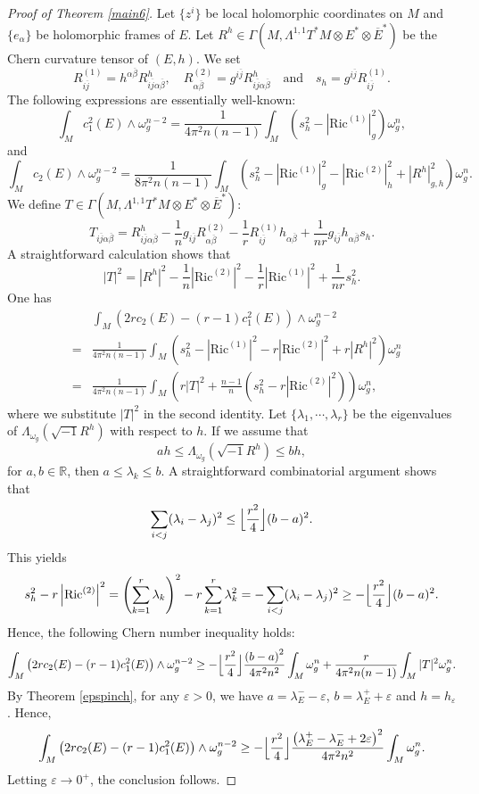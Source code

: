 \documentclass[12pt, reqno]{amsart}
\theoremstyle{plain}
\theoremstyle{definition}
\newcommand{\bproof}{\begin{proof}}
\newcommand{\eproof}{\end{proof}}
\newcommand{\sq}{\sqrt{-1}}
\renewcommand{\bar}{\overline}
\newcommand{\eps}{\varepsilon}
\newcommand{\beq}{\begin{equation}}
\newcommand{\eeq}{\end{equation}}
\newcommand{\ee}{\end{eqnarray*}}
\newcommand{\be}{\begin{eqnarray*}}
\newcommand{\qtq}[1]{\quad\mbox{#1}\quad}
\newcommand{\ts}{\otimes}
\renewcommand{\>}{\rightarrow}
\newcommand{\R}{{\mathbb R}}
\renewcommand{\>}{\rightarrow}
\renewcommand{\bar}{\overline}
\numberwithin{equation}{section} %
\begin{document}
\bproof[Proof of Theorem \ref{main6}] 	
Let $\{z^i\}$ be local holomorphic coordinates on $M$ and $\{e_\alpha\}$ be holomorphic frames of $E$.  Let $R^h\in \Gamma(M,\Lambda^{1,1}T^*M\ts E^*\ts \bar E^*)$ be the Chern curvature  tensor of $(E,h)$.
We set $$R^{(1)}_{i\bar j} =h^{\alpha\bar\beta}R^h_{i\bar j \alpha\bar \beta}, \quad R^{(2)}_{\alpha\bar\beta}=g^{i\bar j}  R^h_{i\bar j \alpha\bar\beta } \qtq{and} s_h =g^{i\bar j} R^{(1)}_{i\bar j}.$$
The following expressions are essentially  well-known:
\beq \label{c1computation} \int_M c^2_1(E) \wedge \omega_g^{n-2} = \frac{1}{4\pi^2n(n-1)}\int_M \left(s_h^2 - \left|\mathrm{Ric}^{(1)}\right|_g^2 \right) \omega_g^n, \eeq
and 
\beq \label{c2computation} \int_M c_2(E) \wedge \omega_g^{n-2} = \frac{1}{8\pi^2n(n-1)}\int_M \left(s_h^2 - \left|\mathrm{Ric}^{(1)}\right|_g^2 - \left| \mathrm{Ric}^{(2)}\right|^2_h + |R^h|_{g,h}^2\right) \omega_g^n. \eeq
We define $T\in \Gamma(M,\Lambda^{1,1}T^*M\ts E^*\ts \bar E^*)$:
\beq T_{i\bar j \alpha\bar\beta } = R^h_{i\bar j\alpha\bar\beta} - \frac{1}{n}g_{i\bar j}R^{(2)}_{\alpha\bar\beta} - \frac{1}{r}R^{(1)}_{i\bar j}h_{\alpha \bar\beta} + \frac{1}{nr}g_{i\bar j}h_{\alpha \bar\beta}s_h. \eeq
A straightforward calculation shows that 
\beq |T|^2=|R^h|^2 - \frac{1}{n}\left|\mathrm{Ric}^{(2)}\right|^2 - \frac{1}{r}\left|\mathrm{Ric}^{(1)}\right|^2 + \frac{1}{nr} s_h^2.\eeq 
One has
\be && \int_M \left(2rc_2(E) - (r-1)c^2_1(E)\right) \wedge \omega_g^{n-2} \\
& = & \frac{1}{4\pi^2n(n-1)}\int_M \left(s_h^2 - \left|\mathrm{Ric}^{(1)}\right|^2 - r\left|\mathrm{Ric}^{(2)}\right|^2 + r|R^h|^2\right) \omega_g^n \\
& = & \frac{1}{4\pi^2n(n-1)}\int_M \left(r|T|^2 + \frac{n-1}{n}\left( s_h^2 - r\left|\mathrm{Ric}^{(2)}\right|^2\right) \right) \omega_g^n, \ee
where we substitute  $|T|^2$ in the second identity.
Let $\{\lambda_1,\cdots, \lambda_r\}$ be the eigenvalues of $ \Lambda_{\omega_g}\left(\sq R^h\right) $  with respect to $ h $.  If we assume that  $$ a h\leq \Lambda_{\omega_g}\left(\sq R^h\right) \leq bh, $$ for $a,b \in \R$, then
$ a \leq \lambda_k \leq b$. 
A straightforward combinatorial  argument shows that
\beq  \sum_{i<j} (\lambda_i-\lambda_j)^2 \leq \Bigl\lfloor \frac{r^2}{4} \Bigr\rfloor(b-a)^2.\eeq 
This yields
\beq s_h^2 - r\left|\mathrm{Ric}^{(2)}\right|^2 = \left(\sum_{k=1}^r \lambda_k\right)^2 - r\sum_{k=1}^r \lambda_k^2=- \sum_{i<j} (\lambda_i-\lambda_j)^2 \geq- \Bigl\lfloor \frac{r^2}{4} \Bigr\rfloor(b-a)^2. \eeq
Hence, the following Chern number inequality holds:
$$ \int_M \left(2rc_2(E) - (r-1)c^2_1(E)\right) \wedge \omega_g^{n-2}\geq  -  \Bigl\lfloor \frac{r^2}{4} \Bigr\rfloor\frac{\left(b - a\right)^2}{4\pi^2n^2}\int_M \omega_g^n+\frac{r}{4\pi^2n(n-1)}\int_M |T|^2\omega_g^n.$$
By Theorem \ref{epspinch}, for any $\eps>0$, we have $a=\lambda_E^--\eps$, $b=\lambda_E^++\eps$ and $h=h_\eps$. Hence, 
$$ \int_M \left(2rc_2(E) - (r-1)c^2_1(E)\right) \wedge \omega_g^{n-2}\geq  -  \Bigl\lfloor \frac{r^2}{4} \Bigr\rfloor\frac{\left(\lambda_E^+-\lambda_E^- +2\eps\right)^2}{4\pi^2n^2}\int_M \omega_g^n.$$
Letting $\eps\>0^+$, the conclusion follows.
\eproof 
\end{document}
